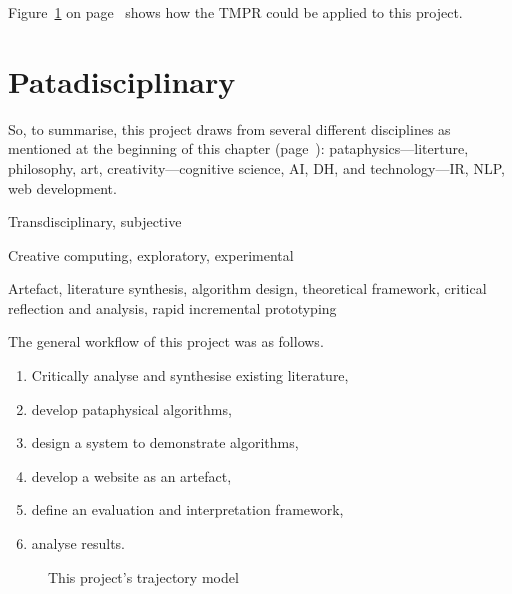 Figure~\ref{fig:ftmpr} on page~\pageref{fig:ftmpr} shows how the \ac{TMPR} could be applied to this project. 


\section{Patadisciplinary}
\label{s:mymeth}

So, to summarise, this project draws from several different disciplines as mentioned at the beginning of this chapter (page~\pageref{ch:methodology}): pataphysics---literture, philosophy, art, creativity---cognitive science, \ac{AI}, \ac{DH}, and technology---\ac{IR}, \ac{NLP}, web development.

\begin{description}[leftmargin=3.2cm]
  \item [Epistemology] Transdisciplinary, subjective
  \item [Methodology] Creative computing, exploratory, experimental
  \item [Methods] Artefact, literature synthesis, algorithm design, theoretical framework, critical reflection and analysis, rapid incremental prototyping
\end{description}

The general workflow of this project was as follows.

\begin{enumerate}
  \item Critically analyse and synthesise existing literature,
  \item develop pataphysical algorithms,
  \item design a system to demonstrate algorithms,
  \item develop a website as an artefact,
  \item define an evaluation and interpretation framework,
  \item analyse results.
\end{enumerate}

\begin{figure}[!htbp] %
  \centering
  \caption[This project's trajectory model]{This project's trajectory model}
\label{fig:ftmpr}
\end{figure}

